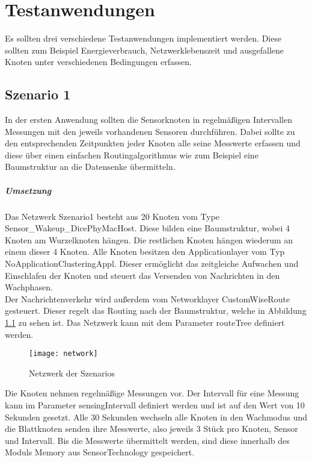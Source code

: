 \chapter{Testanwendungen}
Es sollten drei verschiedene Testanwendungen implementiert werden. Diese sollten zum Beispiel Energieverbrauch, Netzwerklebenszeit und ausgefallene Knoten unter verschiedenen Bedingungen erfassen.\\
\section{Szenario 1}
In der ersten Anwendung sollten die Sensorknoten in regelmäßigen Intervallen Messungen mit den jeweils vorhandenen Sensoren durchführen. Dabei sollte zu den entsprechenden Zeitpunkten jeder Knoten alle seine Messwerte erfassen und diese über einen einfachen Routingalgorithmus wie zum Beispiel eine Baumstruktur an die Datensenke übermitteln.
\paragraph{Umsetzung}
Das Netzwerk Szenario1 besteht aus 20 Knoten vom Type \\Sensor\_Wakeup\_DicePhyMacHost. Diese bilden eine Baumstruktur, wobei 4 Knoten am Wurzelknoten hängen. Die restlichen Knoten hängen wiederum an einem dieser 4 Knoten. Alle Knoten besitzen den Applicationlayer vom Typ NoApplicationClusteringAppl. Dieser ermöglicht das zeitgleiche Aufwachen und Einschlafen der Knoten und steuert das Versenden von Nachrichten in den Wachphasen. \\
Der Nachrichtenverkehr wird außerdem vom Networklayer CustomWiseRoute gesteuert. Dieser regelt das Routing nach der Baumstruktur, welche in Abbildung \ref{fig:nwds} zu sehen ist. Das Netzwerk kann mit dem Parameter routeTree definiert werden.

\begin{figure}[htbp]
\centering
\caption{Netzwerk der Szenarios}
\label{fig:nwds}
\texttt{[image: network]}
\end{figure}

Die Knoten nehmen regelmäßige Messungen vor. Der Intervall für eine Messung kann im Parameter sensingIntervall definiert werden und ist auf den Wert von 10 Sekunden gesetzt. Alle 30 Sekunden wechseln alle Knoten in den Wachmodus und die Blattknoten senden ihre Messwerte, also jeweils 3 Stück pro Knoten, Sensor und Intervall. Bis die Messwerte übermittelt werden, sind diese innerhalb des Moduls Memory aus SensorTechnology gespeichert.

